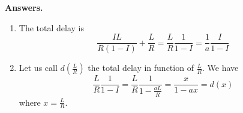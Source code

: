 
\textbf{Answers.}
\begin{enumerate}

  \item The total delay is
    \[
      \frac{IL}{R(1-I)} + \frac{L}{R} = \frac{L}{R} \frac{1}{1-I}
      = \frac{1}{a} \frac{I}{1-I}
    \]

  \item Let us call \(d (\frac{L}{R})\) the total delay in function of
    \(\frac{L}{R}\). We have
    \[
      \frac{L}{R} \frac{1}{1-I} = \frac{L}{R} \frac{1}{1 -
      \frac{aL}{R}} = \frac{x}{1 - ax} = d (x)
    \]
    where \(x = \frac{L}{R}\).

\end{enumerate}
